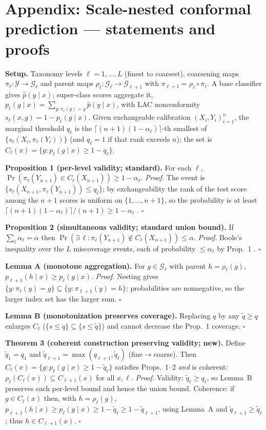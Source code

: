 \documentclass[11pt]{article}
\begin{document}
\clearpage
\section*{Appendix: Scale-nested conformal prediction --- statements and proofs}
\setlength{\parskip}{2pt}
\textbf{Setup.} Taxonomy levels $\ell=1,\dots,L$ (finest to coarsest), coarsening maps
$\pi_\ell:\mathcal Y\to\mathcal G_\ell$ and parent maps $\rho_\ell:\mathcal G_\ell\to\mathcal G_{\ell+1}$
with $\pi_{\ell+1}=\rho_\ell\circ\pi_\ell$. A base classifier gives $\hat p(y\mid x)$; super-class
scores aggregate it, $p_\ell(g\mid x)=\sum_{y:\pi_\ell(y)=g}\hat p(y\mid x)$, with LAC nonconformity
$s_\ell(x,g)=1-p_\ell(g\mid x)$. Given exchangeable calibration $(X_i,Y_i)_{i=1}^n$, the marginal
threshold $q_\ell$ is the $\lceil(n+1)(1-\alpha_\ell)\rceil$-th smallest of $\{s_\ell(X_i,\pi_\ell(Y_i))\}$
(and $q_\ell=1$ if that rank exceeds $n$); the set is $C_\ell(x)=\{g:p_\ell(g\mid x)\ge 1-q_\ell\}$.

\textbf{Proposition 1 (per-level validity; standard).} For each $\ell$,
$\Pr(\pi_\ell(Y_{n+1})\in C_\ell(X_{n+1}))\ge 1-\alpha_\ell$.
\emph{Proof.} The event is $\{s_\ell(X_{n+1},\pi_\ell(Y_{n+1}))\le q_\ell\}$; by exchangeability the
rank of the test score among the $n+1$ scores is uniform on $\{1,\dots,n+1\}$, so the probability is at
least $\lceil(n+1)(1-\alpha_\ell)\rceil/(n+1)\ge 1-\alpha_\ell$ \citep{vovk2005algorithmic,sadinle2019least}.
$\square$

\textbf{Proposition 2 (simultaneous validity; standard union bound).} If $\sum_\ell\alpha_\ell=\alpha$
then $\Pr(\exists\,\ell:\pi_\ell(Y_{n+1})\notin C_\ell(X_{n+1}))\le\alpha$.
\emph{Proof.} Boole's inequality over the $L$ miscoverage events, each of probability $\le\alpha_\ell$ by
Prop.~1 \citep{baheri2025multiscale}. $\square$

\textbf{Lemma A (monotone aggregation).} For $g\in\mathcal G_\ell$ with parent $h=\rho_\ell(g)$,
$p_{\ell+1}(h\mid x)\ge p_\ell(g\mid x)$.
\emph{Proof.} Nesting gives $\{y:\pi_\ell(y)=g\}\subseteq\{y:\pi_{\ell+1}(y)=h\}$; probabilities are
nonnegative, so the larger index set has the larger sum. $\square$

\textbf{Lemma B (monotonization preserves coverage).} Replacing $q$ by any $\tilde q\ge q$ enlarges
$C_\ell$ ($\{s\le q\}\subseteq\{s\le\tilde q\}$) and cannot decrease the Prop.~1 coverage. $\square$

\textbf{Theorem 3 (coherent construction preserving validity; new).} Define
$\tilde q_1=q_1$ and $\tilde q_{\ell+1}=\max(q_{\ell+1},\tilde q_\ell)$ (fine$\to$coarse). Then
$C_\ell(x)=\{g:p_\ell(g\mid x)\ge 1-\tilde q_\ell\}$ satisfies Props.~1--2 \emph{and} is coherent:
$\rho_\ell(C_\ell(x))\subseteq C_{\ell+1}(x)$ for all $x,\ell$.
\emph{Proof.} Validity: $\tilde q_\ell\ge q_\ell$, so Lemma~B preserves each per-level bound and hence
the union bound. Coherence: if $g\in C_\ell(x)$ then, with $h=\rho_\ell(g)$,
$p_{\ell+1}(h\mid x)\ge p_\ell(g\mid x)\ge 1-\tilde q_\ell\ge 1-\tilde q_{\ell+1}$, using Lemma~A and
$\tilde q_{\ell+1}\ge\tilde q_\ell$; thus $h\in C_{\ell+1}(x)$. $\square$
\end{document}
